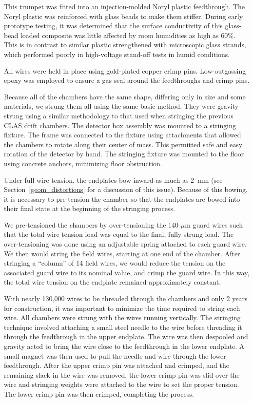 This trumpet was fitted into an injection-molded Noryl plastic feedthrough.  
The Noryl plastic was reinforced with glass beads to make them stiffer.
During early prototype testing, it was determined that the surface conductivity
of this glass-bead loaded composite was little affected by room humidities
as high as 60\%.  This is in contrast to similar plastic strengthened
with microscopic glass strands, which performed poorly in high-voltage stand-off
tests in humid conditions.

All wires were held in place using gold-plated copper crimp pins.  
Low-outgassing epoxy was employed to ensure a gas seal around the feedthroughs 
and crimp pins.  

Because all of the chambers have the same shape, differing only in
size and some materials, we strung them all using the same basic method.
They were gravity-strung using a similar methodology to that 
used when stringing the previous CLAS drift chambers.  The detector box 
assembly was mounted to a stringing fixture.  The frame was connected to 
the fixture using attachments that allowed the chambers to rotate along 
their center of mass.  This permitted safe and easy 
rotation of the detector by hand.  
The stringing fixture was mounted to the floor using 
concrete anchors, minimizing floor obstruction.

Under full wire tension, the endplates bow inward as much as 2~mm 
(see Section~\ref{geom_distortions} for a discussion of this issue).
Because of this bowing, it is necessary to pre-tension the chamber
so that the endplates are bowed into their final state at the 
beginning of the stringing process.

We pre-tensioned the chambers by over-tensioning the 140 $\mu$m guard
wires such that the total wire tension load was equal to the final, 
fully strung load.  The over-tensioning was done using an adjustable
spring attached to each guard wire. 
We then would string the field wires, starting at one end of the chamber.
After stringing a ``column'' of 14 field wires, we would reduce the
tension on the associated guard wire to its nominal value, and crimp
the guard wire.  In this way, the total wire tension on the endplate
remained approximately constant.


With nearly 130,000 wires to be threaded through the chambers and only 2 years 
for construction, it was important to minimize the time required to string 
each wire.  All chambers were strung with 
the wires running vertically.  The stringing technique involved attaching a 
small steel needle to the wire before threading it through the feedthrough in 
the upper endplate.  The wire was then despooled and gravity acted to bring the 
wire close to the feedthrough in the lower endplate.  A small magnet was then 
used to pull the needle and wire through the lower feedthrough.  After the upper 
crimp pin was attached and crimped, and the remaining slack in the wire was removed, the lower 
crimp pin was slid over the wire and stringing weights were attached to the wire to set the 
proper tension.  The lower crimp pin was then crimped, completing the process.


